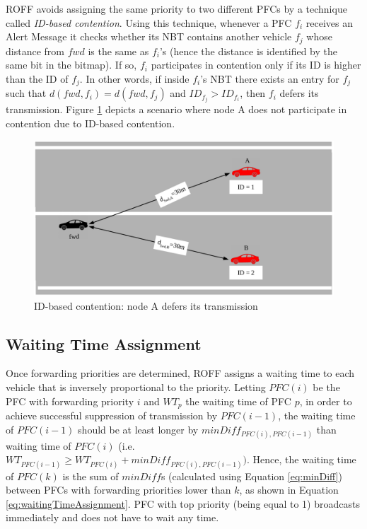 			
			ROFF avoids assigning the same priority to two different PFCs by a technique called \textit{ID-based contention}. Using this technique, whenever a PFC $f_i$ receives an Alert Message it checks whether its NBT contains another vehicle $f_j$ whose distance from $fwd$ is the same as $f_i$'s (hence the distance is identified by the same bit in the bitmap). If so, $f_i$ participates in contention only if its ID is higher than the ID of $f_j$. In other words, if inside $f_i$'s NBT there exists an entry for $f_j$ such that $d(fwd, f_i) = d(fwd, f_j)$ and $ID_{f_j} > ID_{f_i}$, then $f_i$ defers its transmission. Figure \ref{fig:idBasedContention} depicts a scenario where node A does not participate in contention due to ID-based contention.
	
			\begin{figure}[H]
				\centering
				\includegraphics[width=\textwidth]{immagini/idBasedContention}
				\caption{ID-based contention: node A defers its transmission}
				\label{fig:idBasedContention}
			\end{figure}
		
		\subsection{Waiting Time Assignment}
			Once forwarding priorities are determined, ROFF assigns a waiting time to each vehicle that is inversely proportional to the priority. Letting $PFC(i)$ be the PFC with forwarding priority $i$ and $WT_p$ the waiting time of PFC $p$, in order to achieve successful suppression of transmission by $PFC(i-1)$, the waiting time of $PFC(i-1)$ should be at least longer by $minDiff_{PFC(i), PFC(i-1)}$ than waiting time of $PFC(i)$ (i.e. $WT_{PFC(i-1)} \geq WT_{PFC(i)} + minDiff_{PFC(i), PFC(i-1)})$. Hence, the waiting time of $PFC(k)$ is the sum of $minDiff$s (calculated using Equation \ref{eq:minDiff}) between PFCs with forwarding priorities lower than $k$, as shown in Equation \ref{eq:waitingTimeAssignment}. PFC with top priority (being equal to 1) broadcasts immediately and does not have to wait any time.
			
